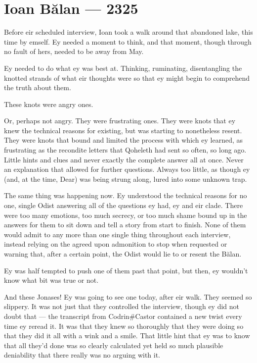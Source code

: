 \hypertarget{ioan-bux103lan-2325}{%
\chapter{Ioan Bălan — 2325}\label{ioan-bux103lan-2325}}

Before eir scheduled interview, Ioan took a walk around that abandoned lake, this time by emself. Ey needed a moment to think, and that moment, though through no fault of hers, needed to be away from May.

Ey needed to do what ey was best at. Thinking, ruminating, disentangling the knotted strands of what eir thoughts were so that ey might begin to comprehend the truth about them.

These knots were angry ones.

Or, perhaps not angry. They were frustrating ones. They were knots that ey knew the technical reasons for existing, but was starting to nonetheless resent. They were knots that bound and limited the process with which ey learned, as frustrating as the recondite letters that Qoheleth had sent so often, so long ago. Little hints and clues and never exactly the complete answer all at once. Never an explanation that allowed for further questions. Always too little, as though ey (and, at the time, Dear) was being strung along, lured into some unknown trap.

The same thing was happening now. Ey understood the technical reasons for no one, single Odist answering all of the questions ey had, ey and eir clade. There were too many emotions, too much secrecy, or too much shame bound up in the answers for them to sit down and tell a story from start to finish. None of them would admit to any more than one single thing throughout each interview, instead relying on the agreed upon admonition to stop when requested or warning that, after a certain point, the Odist would lie to or resent the Bălan.

Ey was half tempted to push one of them past that point, but then, ey wouldn't know what bit was true or not.

And these Jonases! Ey was going to see one today, after eir walk. They seemed so slippery. It was not just that they controlled the interview, though ey did not doubt that — the transcript from Codrin\#Castor contained a new twist every time ey reread it. It was that they knew so thoroughly that they were doing so that they did it all with a wink and a smile. That little hint that ey was to know that all they'd done was so clearly calculated yet held so much plausible deniability that there really was no arguing with it.

